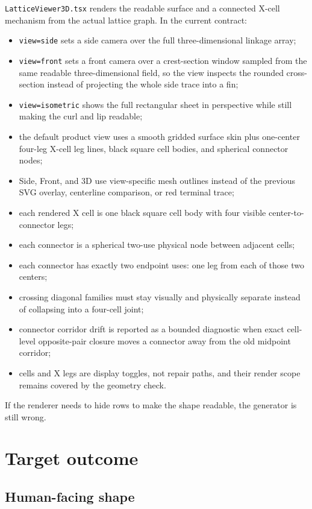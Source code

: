 \documentclass[12pt,letterpaper]{article}
\newcommand{\code}[1]{\texttt{#1}}
\begin{document}
\code{LatticeViewer3D.tsx} renders the readable surface and a connected X-cell mechanism from the actual lattice graph. In the current contract:
\begin{itemize}
  \item \code{view=side} sets a side camera over the full three-dimensional linkage array;
  \item \code{view=front} sets a front camera over a crest-section window sampled from the same readable three-dimensional field, so the view inspects the rounded cross-section instead of projecting the whole side trace into a fin;
  \item \code{view=isometric} shows the full rectangular sheet in perspective while still making the curl and lip readable;
  \item the default product view uses a smooth gridded surface skin plus one-center four-leg X-cell leg lines, black square cell bodies, and spherical connector nodes;
  \item Side, Front, and 3D use view-specific mesh outlines instead of the previous SVG overlay, centerline comparison, or red terminal trace;
  \item each rendered X cell is one black square cell body with four visible center-to-connector legs;
  \item each connector is a spherical two-use physical node between adjacent cells;
  \item each connector has exactly two endpoint uses: one leg from each of those two centers;
  \item crossing diagonal families must stay visually and physically separate instead of collapsing into a four-cell joint;
  \item connector corridor drift is reported as a bounded diagnostic when exact cell-level opposite-pair closure moves a connector away from the old midpoint corridor;
  \item cells and X legs are display toggles, not repair paths, and their render scope remains covered by the geometry check.
\end{itemize}
If the renderer needs to hide rows to make the shape readable, the generator is still wrong.

\section{Target outcome}

\subsection{Human-facing shape}
\end{document}

